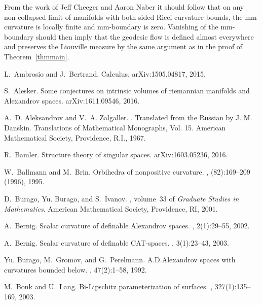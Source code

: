 \documentclass[12pt,leqno,intlimits]{amsart}
\numberwithin{equation}{section}
\theoremstyle{definition}
\theoremstyle{remark}
\begin{document}
From the work of Jeff Cheeger and Aaron Naber \cite{Ch-Na-codim4} it should follow that on any non-collapsed limit of manifolds with both-sided Ricci curvature bounds, the mm-curvature is locally finite and mm-boundary is zero.
Vanishing of the mm-boundary should then imply that the geodesic flow is defined almost everywhere and preserves the Liouville measure by the same argument as in the proof of Theorem~\ref{thmmain}.

%
\begin{thebibliography}{KMS01}

L.~Ambrosio and J.~Bertrand.
 {C}alculus.
\newblock arXiv:1505.04817, 2015.

S.~Alesker.
\newblock Some conjectures on intrinsic volumes of riemannian manifolds and
{Alexandrov} spaces.
\newblock arXiv:1611.09546, 2016.

A.~D. Aleksandrov and V.~A. Zalgaller.
.
\newblock Translated from the Russian by J. M. Danskin. Translations of
Mathematical Monographs, Vol. 15. American Mathematical Society, Providence,
R.I., 1967.

R.~Bamler.
\newblock Structure theory of singular spaces.
\newblock arXiv:1603.05236, 2016.

W.~Ballmann and M.~Brin.
\newblock Orbihedra of nonpositive curvature.
, (82):169--209 (1996),
1995.

D.~Burago, Yu. Burago, and S.~Ivanov.
, volume~33 of {\em Graduate Studies
in Mathematics}.
\newblock American Mathematical Society, Providence, RI, 2001.

A.~Bernig.
\newblock Scalar curvature of definable {A}lexandrov spaces.
, 2(1):29--55, 2002.

A.~Bernig.
\newblock Scalar curvature of definable {CAT}-spaces.
, 3(1):23--43, 2003.

Yu. Burago, M.~Gromov, and G.~Perelmann.
\newblock A.{D}.{Alexandrov} spaces with curvatures bounded below.
, 47(2):1--58, 1992.

M.~Bonk and U.~Lang.
\newblock Bi-Lipschitz parameterization of surfaces.
, 327(1):135--169, 2003.


\end{thebibliography}
\end{document}
